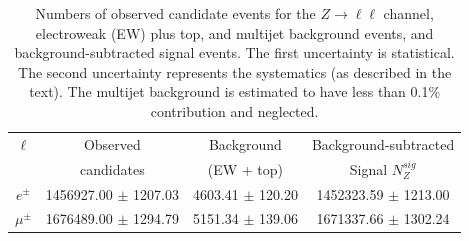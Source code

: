 \begin{table}[h]
\begin{center}
\begin{tabular}{ | c || c || c || c |  }
\hline
$\ell$ & Observed   &  Background & Background-subtracted \\
        & candidates & (EW + top)  & Signal $N_{Z}^{sig}$ \\
\hline
\hline
$e^{\pm}$ & 1456927.00 $\pm$ 1207.03 & 4603.41 $\pm$ 120.20 & 1452323.59 $\pm$ 1213.00\\
\hline
$\mu^{\pm}$ & 1676489.00 $\pm$ 1294.79 & 5151.34 $\pm$ 139.06 & 1671337.66 $\pm$ 1302.24\\
\hline
\end{tabular}
\caption{
Numbers of observed candidate events for the $Z \rightarrow \ell\ell$ channel, electroweak (EW) plus top, and multijet background events, and background-subtracted signal events.
The first uncertainty is statistical.
The second uncertainty represents the systematics (as described in the text).
The multijet background is estimated to have less than 0.1\% contribution and neglected.
}
\label{tbl:ZR_observed_candidates}
\end{center}
\end{table}

\clearpage